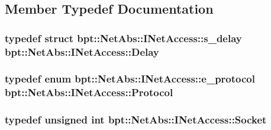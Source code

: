 \subsection{Member Typedef Documentation}
\hypertarget{classbpt_1_1_net_abs_1_1_i_net_access_a0bbbaf7492f6c93185acd8b359a347d1}{
\subsubsection[{Delay}]{\setlength{\rightskip}{0pt plus 5cm}typedef struct {\bf bpt\-::\-Net\-Abs\-::\-I\-Net\-Access\-::s\-\_\-delay}				 {\bf bpt\-::\-Net\-Abs\-::\-I\-Net\-Access\-::\-Delay}}}\label{classbpt_1_1_net_abs_1_1_i_net_access_a0bbbaf7492f6c93185acd8b359a347d1}
\hypertarget{classbpt_1_1_net_abs_1_1_i_net_access_a4464fb7197d6a70c84c93aadaae560f6}{
\subsubsection[{Protocol}]{\setlength{\rightskip}{0pt plus 5cm}typedef enum {\bf bpt\-::\-Net\-Abs\-::\-I\-Net\-Access\-::e\-\_\-protocol}			 {\bf bpt\-::\-Net\-Abs\-::\-I\-Net\-Access\-::\-Protocol}}}\label{classbpt_1_1_net_abs_1_1_i_net_access_a4464fb7197d6a70c84c93aadaae560f6}
\hypertarget{classbpt_1_1_net_abs_1_1_i_net_access_ae5a8cad46f8006b85b535f126b697efc}{
\subsubsection[{Socket}]{\setlength{\rightskip}{0pt plus 5cm}typedef {\bf unsigned} {\bf int} {\bf bpt\-::\-Net\-Abs\-::\-I\-Net\-Access\-::\-Socket}}}\label{classbpt_1_1_net_abs_1_1_i_net_access_ae5a8cad46f8006b85b535f126b697efc}


